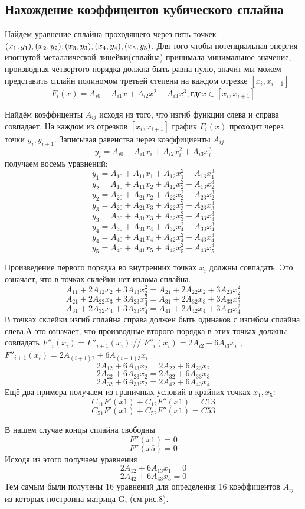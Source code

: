 \documentclass[russian,utf8,nocolumnxxxi,nocolumnxxxii]{eskdtext}
\begin{document}
\subsection{Нахождение коэффицентов кубического сплайна}

\normalsize Найдем уравнение сплайна проходящего через пять точкек $(x_1, y_1),\\
(x_2, y_2), (x_3, y_3), (x_4, y_4), (x_5, y_5) $. Для того чтобы потенциальная энергия изогнутой
металлической линейки(сплайна) принимала минимальное значение,
производная четвертого порядка должна быть равна нулю, значит мы
можем представить сплайн полиномом третьей степени на каждом отрезке
$[x_i, x_{i+1}]$
$$F_i(x) = A_{i0} + A_{i1}x + A_{i2}x^2 + A_{i3}x^3, где x \in [x_i, x_{i+1}]$$

Найдём коэффиценты $A_{ij}$ исходя из того, что изгиб функции слева и справа совпадает. На каждом из отрезков $[x_i,x_{i+1}]$ график $F_i(x)$ проходит через точки $y_i,y_{i+1}$. Записывая равенства через коэффициенты $A_{ij}$
$$y_i=A_{i0}+A_{i1}x_i+A_{i2}x_i^2+A_{i3}x_i^3$$
получаем восемь уравнений:
$$y_1=A_{10}+A_{11}x_1+A_{12}x_1^2+A_{13}x_1^3$$
$$y_2=A_{10}+A_{11}x_2+A_{12}x_2^2+A_{13}x_2^3$$
$$y_2=A_{20}+A_{21}x_2+A_{22}x_2^2+A_{23}x_2^3$$
$$y_3=A_{20}+A_{21}x_3+A_{22}x_3^2+A_{23}x_3^3$$
$$y_3=A_{30}+A_{31}x_3+A_{32}x_3^2+A_{33}x_3^3$$
$$y_4=A_{30}+A_{31}x_4+A_{32}x_4^2+A_{33}x_4^3$$
$$y_4=A_{40}+A_{41}x_4+A_{42}x_4^2+A_{43}x_4^3$$
$$y_5=A_{40}+A_{41}x_5+A_{42}x_5^2+A_{43}x_5^3$$

Произведение первого порядка во внутренних точках $x_i$ должны совпадать. Это означает, что в точках склейки нет излома сплайна.
$$A_{11}+2A_{12}x_2+3A_{13}x_2^2=A_{21}+2A_{22}x_2+3A_{23}x_2^2$$
$$A_{21}+2A_{22}x_3+3A_{23}x_3^2=A_{31}+2A_{32}x_3+3A_{33}x_3^2$$
$$A_{31}+2A_{32}x_4+3A_{33}x_4^2=A_{41}+2A_{42}x_4+3A_{43}x_4^2$$
В точках склейки изгиб сплайна справа должен быть одинаков с изгибом сплайна слева.А это означает, что производные второго порядка в этих точках должны совпадать $F''_i(x_i)=F''_{i+1}(x_i)$;//
$F''_i(x_i)=2A_{i2}+6A_{i3}x_i $ ;   $F''_{i+1}(x_i)=2A_{(i+1)2}+6A_{(i+1)3}x_i$
$$2A_{12}+6A_{13}x_2=2A_{22}+6A_{23}x_2$$
$$2A_{22}+6A_{23}x_2=2A_{32}+6A_{33}x_3$$
$$2A_{32}+6A_{33}x_2=2A_{42}+6A_{43}x_4$$
Ещё два примера получаем из граничных условий в крайних точках $x_1,x_5$:
$$C_{11}F'(x1)+C_{12}F''(x1)=C13$$
$$C_{51}F'(x1)+C_{52}F''(x1)=C53$$

В нашем случае концы сплайна свободны
$$F''(x1)=0$$
$$F''(x5)=0$$
Исходя из этого получаем уравнения
$$2A_{12}+6A_{13}x_1=0$$
$$2A_{42}+6A_{43}x_5=0$$
Тем самым были получены 16 уравнений для определения 16 коэффицентов $A_{ij}$
из которых построина матрица G, (см.рис.8).
\\ \\
\end{document}
